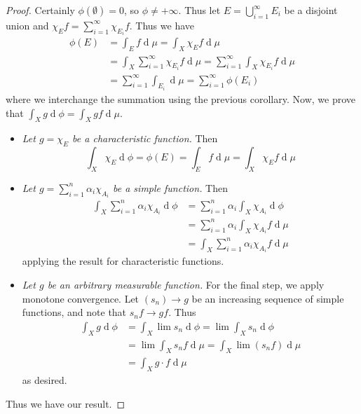 \documentclass[12pt, a4paper]{book}
\renewcommand{\d}[1]{\ensuremath{\operatorname{d}\!{#1}}} %
\theoremstyle{nonumberplain}
\newtheorem{proof}{Proof}
\begin{document}
\begin{proof}
    Certainly $\phi(\emptyset)=0$, so $\phi\neq+\infty$.
    Thus let $E=\bigcup_{i=1}^\infty E_i$ be a disjoint union and $\chi_E f=\sum_{i=1}^\infty\chi_{E_i}f$.
    Thus we have
    \begin{align*}
        \phi(E) &= \int_Ef\d{\mu}= \int_X\chi_E f\d{\mu}\\
                &= \int_X\sum\limits_{i=1}^\infty \chi_{E_i}f\d{\mu}= \sum\limits_{i=1}^\infty\int_X\chi_{E_i}f\d{\mu}\\
                &= \sum\limits_{i=1}^\infty \int_{E_i}\d{\mu}= \sum\limits_{i=1}^\infty\phi(E_i)
    \end{align*}
    where we interchange the summation using the previous corollary.
    Now, we prove that $\int_X g\d{\phi}=\int_Xgf\d{\mu}$.
    \begin{itemize}[nolistsep]
        \item \textit{Let $g=\chi_E$ be a characteristic function.}
            Then
            \begin{equation*}
                \int_X\chi_E\d{\phi}=\phi(E)=\int_E f\d{\mu}=\int_X\chi_E f\d{\mu}
            \end{equation*}
        \item \textit{Let $g=\sum\limits_{i=1}^n\alpha_i\chi_{A_i}$ be a simple function.}
            Then
            \begin{align*}
                \int_X\sum\limits_{i=1}^n\alpha_i\chi_{A_i}\d{\phi}&=\sum\limits_{i=1}^n\alpha_i\int_X\chi_{A_i}\d{\phi}\\
                                                                   &=\sum\limits_{i=1}^n\alpha_i\int_X\chi_{A_i}f\d{\mu}\\
                                                                   &=\int_X\sum\limits_{i=1}^n\alpha_i\chi_{A_i}f\d{\mu}
            \end{align*}
            applying the result for characteristic functions.
        \item \textit{Let $g$ be an arbitrary measurable function.}
            For the final step, we apply monotone convergence.
            Let $(s_n)\to g$ be an increasing sequence of simple functions, and note that $s_nf\to gf$.
            Thus
            \begin{align*}
                \int_Xg\d{\phi}&=\int_X\lim s_n\d{\phi}=\lim\int_Xs_n\d{\phi}\\
                               &=\lim\int_Xs_n f\d{\mu}=\int_X\lim(s_nf)\d{\mu}\\
                               &=\int_Xg\cdot f\d{\mu}
            \end{align*}
            as desired.
    \end{itemize}
    Thus we have our result.
\end{proof}
\end{document}
